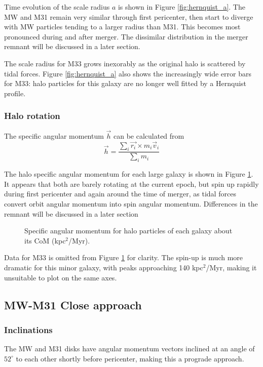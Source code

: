 \documentclass[twocolumn]{aastex63}
\begin{document}
Time evolution of the scale radius $a$ is shown in Figure \ref{fig:hernquist_a}. The MW and M31 remain very similar through first pericenter, then start to diverge with MW particles tending to a larger radius than M31. This becomes most pronounced during and after merger. The dissimilar distribution in the merger remnant will be discussed in a later section.  

The scale radius for M33 grows inexorably as the original halo is scattered by tidal forces. Figure \ref{fig:hernquist_a} also shows the increasingly wide error bars for M33: halo particles for this galaxy are no longer well fitted by a Hernquist profile.

\subsubsection{Halo rotation}

The specific angular momentum $\vec{h}$ can be calculated from
\[ \vec{h} = \frac{\sum_i{\vec{r_i} \times m_i \vec{v}_i}}{\sum_i{m_i}} \]

The halo specific angular momentum for each large galaxy is shown in Figure \ref{fig:halo_h}. It appears that both are barely rotating at the current epoch, but spin up rapidly during first pericenter and again around the time of merger, as tidal forces convert orbit angular momentum into spin angular momentum. Differences in the remnant will be discussed in a later section

\begin{figure}[htb!]
	\caption{Specific angular momentum for halo particles of each galaxy about its CoM (kpc$^2$/Myr).
		\label{fig:halo_h}}
\end{figure}

Data for M33 is omitted from Figure \ref{fig:halo_h} for clarity. The spin-up is much more dramatic for this minor galaxy, with peaks approaching 140 kpc$^2$/Myr, making it unsuitable to plot on the same axes.

\subsection{MW-M31 Close approach}

\subsubsection{Inclinations}

The MW and M31 disks have angular momentum vectors inclined at an angle of $52^\circ$ to each other shortly before pericenter, making this a prograde approach.
\end{document}
